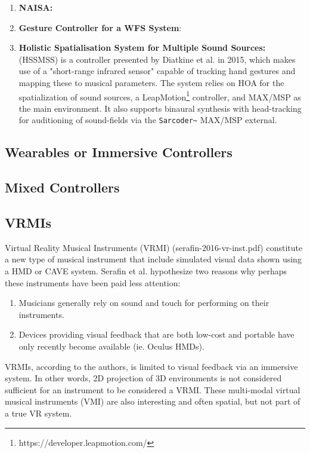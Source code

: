 \begin{enumerate}
    \item \textbf{NAISA:}
    \item \textbf{Gesture Controller for a WFS System}:
    
    \item \textbf{Holistic Spatialisation System for Multiple Sound Sources:} (HSSMSS) is a controller presented by Diatkine et al. in 2015, which makes use of a "short-range infrared sensor" capable of tracking hand gestures and mapping these to musical parameters. The system relies on HOA for the spatialization of sound sources, a LeapMotion\footnote{https://developer.leapmotion.com/} controller, and MAX/MSP as the main environment. It also supports binaural synthesis with head-tracking for auditioning of sound-fields via the \texttt{Sarcoder\~} MAX/MSP external.
\end{enumerate}

\subsection{Wearables or Immersive Controllers} %


\subsection{Mixed Controllers} %


\subsection{VRMIs}

Virtual Reality Musical Instruments (VRMI) (serafin-2016-vr-inst.pdf) constitute a new type of musical instrument that include simulated visual data shown using a HMD or CAVE system. Serafin et al. hypothesize two reasons why perhaps these instruments have been paid less attention:

\begin{enumerate}
    \item Musicians generally rely on sound and touch for performing on their instruments.
    \item Devices providing visual feedback that are both low-cost and portable have only recently become available (ie. Oculus HMDs). 
\end{enumerate}

VRMIs, according to the authors, is limited to visual feedback via an immersive system. In other words, 2D projection of 3D environments is not considered sufficient for an instrument to be considered a VRMI. These multi-modal virtual musical instruments (VMI) are also interesting and often spatial, but not part of a true VR system.


